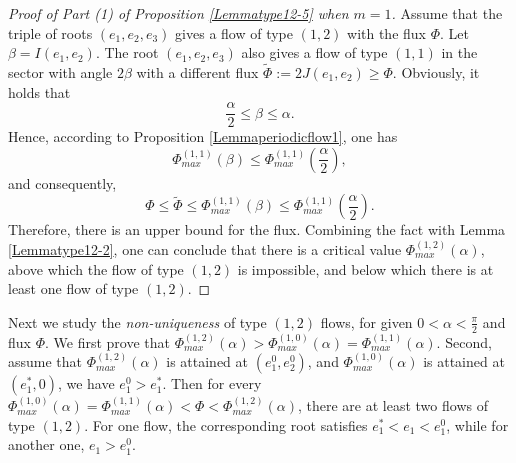 \documentclass[reqno,12pt]{amsart}
\begin{document}

\begin{proof}[Proof of Part (1) of Proposition \ref{Lemmatype12-5} when $m=1$] Assume that the triple of roots $(e_1, e_2, e_3)$ gives a flow of type $(1, 2)$  with the flux $\Phi$.  Let $\beta = I(e_1, e_2)$. The root  $(e_1, e_2, e_3)$ also gives a flow of type $(1, 1)$ in the sector with angle $2\beta$  with a different flux $\tilde{\Phi}:=2J(e_1,e_2)\geq\Phi$. Obviously, it holds that 
\begin{equation*}
    \frac{\alpha}{2} \leq   \beta \leq  \alpha. 
\end{equation*}
Hence, according to Proposition \ref{Lemmaperiodicflow1}, one has
\begin{equation*}
    \Phi_{max}^{(1, 1)} (\beta) \leq \Phi_{max}^{(1, 1)}\left(\frac{\alpha}{2}\right), 
\end{equation*}
and consequently, 
\begin{equation}\label{new1}
    \Phi
    \leq \tilde{\Phi}\leq
    \Phi_{max}^{(1, 1)}(\beta) \leq \Phi_{max}^{(1, 1)}\left(\frac{\alpha}{2}\right). 
\end{equation}
Therefore, there is an upper bound for the flux. Combining the fact with Lemma \ref{Lemmatype12-2}, one can conclude that there is a critical value $\Phi_{max}^{(1, 2)}(\alpha)$, above which the flow of type $(1, 2)$ is impossible, and below which there is at least one flow of type $(1, 2)$.
\end{proof}

Next we study the \emph{non-uniqueness} of type $(1, 2)$ flows, for given $0< \alpha< \frac{\pi}{2}$ and flux $\Phi$. We first prove that  $\Phi_{max}^{(1, 2)}(\alpha) > \Phi_{max}^{(1, 0)}(\alpha)= \Phi_{max}^{(1, 1)}(\alpha)$. Second, assume that $\Phi_{max}^{(1, 2)}(\alpha)$ is attained at $(e_1^0, e_2^0)$, and $\Phi_{max}^{(1, 0)}(\alpha)$ is attained at $(e_1^*, 0)$, we have $e_1^0> e_1^*$. %
Then for every $\Phi_{max}^{(1, 0)}(\alpha)=\Phi_{max}^{(1, 1)}(\alpha)< \Phi < \Phi_{max}^{(1, 2)}(\alpha)$, there are at least two flows of type $(1, 2)$. For one flow, the corresponding root satisfies $e_1^* < e_1 < e_1^0$, while for another one, $e_1> e_1^0$. 
\end{document}
